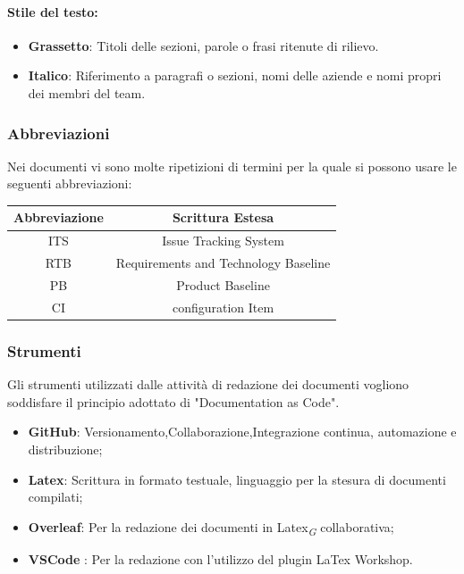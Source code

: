 \documentclass{article}
\begin{document}
\paragraph*{Stile del testo:}
\begin{itemize}
    \item \textbf{Grassetto}: Titoli delle sezioni, parole o frasi ritenute di rilievo.
    \item \textbf{Italico}: Riferimento a paragrafi o sezioni, nomi delle aziende e nomi propri dei membri del team.
\end{itemize}
\subsubsection{Abbreviazioni}
Nei documenti vi sono molte ripetizioni di termini per la quale si possono usare le seguenti abbreviazioni:\\
\vspace{0.2cm}
\begin{tabular}{|c|c|}
    \hline
    \textbf{Abbreviazione} & \textbf{Scrittura Estesa}            \\
    \hline
    ITS                    & Issue Tracking System                \\
    RTB                    & Requirements and Technology Baseline \\
    PB                     & Product Baseline                     \\
    CI                     & configuration Item                   \\
    \hline
\end{tabular}

\subsubsection{Strumenti}
Gli strumenti utilizzati dalle attività di redazione dei documenti vogliono soddisfare il principio adottato di "Documentation as Code".
\begin{itemize}
    \item \textbf{GitHub}: Versionamento,Collaborazione,Integrazione continua, automazione e distribuzione;
    \item \textbf{Latex}: Scrittura in formato testuale, linguaggio per la stesura di documenti compilati;
    \item \textbf{Overleaf}: Per la redazione dei documenti in Latex\textsubscript{\textit{G}} collaborativa;
    \item \textbf{VSCode} : Per la redazione con l'utilizzo del plugin LaTex Workshop.
\end{itemize}
\end{document}

